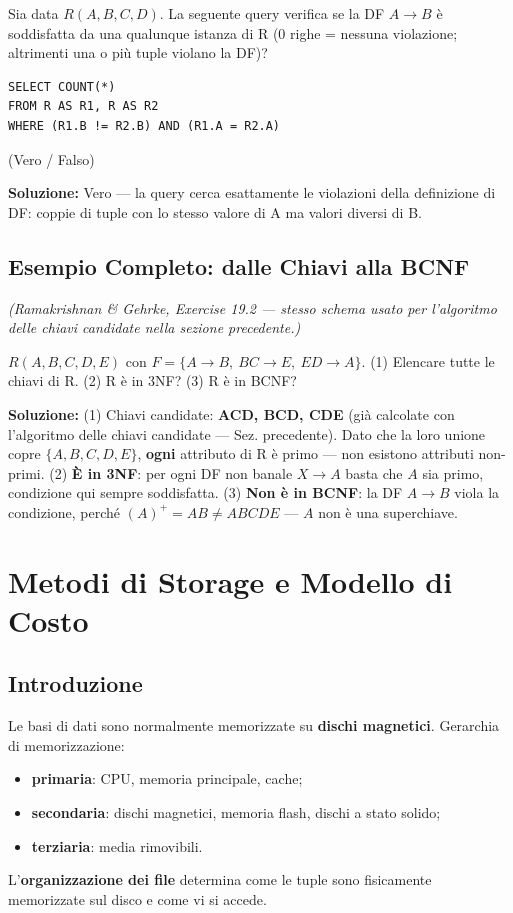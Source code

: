 \documentclass[12pt, a4paper]{article}
\begin{document}
\begin{tcolorbox}[colback=lightergray!10, colframe=tocsec, title=\textbf{Esercizio 6}]
Sia data $R(A,B,C,D)$. La seguente query verifica se la DF $A\to B$ è soddisfatta da una qualunque istanza di R (0 righe = nessuna violazione; altrimenti una o più tuple violano la DF)?
\begin{verbatim}
SELECT COUNT(*)
FROM R AS R1, R AS R2
WHERE (R1.B != R2.B) AND (R1.A = R2.A)
\end{verbatim}
(Vero / Falso)
\end{tcolorbox}
\textbf{Soluzione:} Vero — la query cerca esattamente le violazioni della definizione di DF: coppie di tuple con lo stesso valore di A ma valori diversi di B.

\subsection{Esempio Completo: dalle Chiavi alla BCNF}
\textit{(Ramakrishnan \& Gehrke, Exercise 19.2 — stesso schema usato per l'algoritmo delle chiavi candidate nella sezione precedente.)}

\begin{tcolorbox}[colback=lightergray!10, colframe=tocsec, title=\textbf{Esercizio 7}]
$R(A,B,C,D,E)$ con $F=\{A\to B,\ BC\to E,\ ED\to A\}$. (1) Elencare tutte le chiavi di R. (2) R è in 3NF? (3) R è in BCNF?
\end{tcolorbox}
\textbf{Soluzione:} (1) Chiavi candidate: \textbf{ACD, BCD, CDE} (già calcolate con l'algoritmo delle chiavi candidate — Sez. precedente). Dato che la loro unione copre $\{A,B,C,D,E\}$, \textbf{ogni} attributo di R è primo — non esistono attributi non-primi. (2) \textbf{È in 3NF}: per ogni DF non banale $X\to A$ basta che $A$ sia primo, condizione qui sempre soddisfatta. (3) \textbf{Non è in BCNF}: la DF $A\to B$ viola la condizione, perché $(A)^+=AB \neq ABCDE$ — $A$ non è una superchiave.

\section{Metodi di Storage e Modello di Costo}

\subsection{Introduzione}

Le basi di dati sono normalmente memorizzate su \textbf{dischi magnetici}. Gerarchia di memorizzazione:
\begin{itemize}
    \item \textbf{primaria}: CPU, memoria principale, cache;
    \item \textbf{secondaria}: dischi magnetici, memoria flash, dischi a stato solido;
    \item \textbf{terziaria}: media rimovibili.
\end{itemize}
L'\textbf{organizzazione dei file} determina come le tuple sono fisicamente memorizzate sul disco e come vi si accede.
\end{document}
